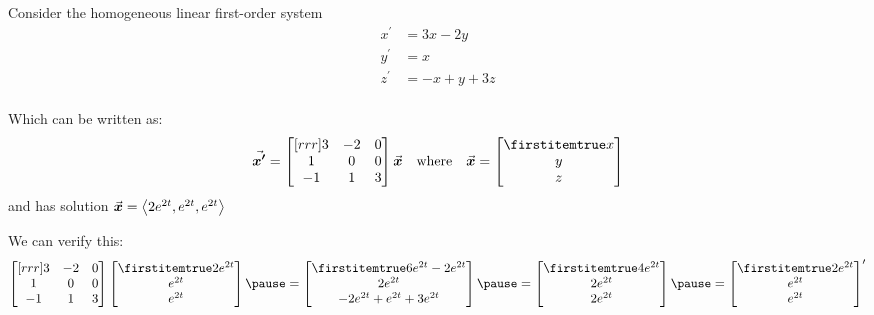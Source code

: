 \documentclass{beamer}
\begin{document}
\begin{frame}
\begin{example}
Consider the homogeneous linear first-order system
\begin{equation*}
\begin{aligned}
x^\prime &= 3x - 2y \\
y^\prime &= x \\
z^\prime &= -x + y + 3z \\
\end{aligned}
\end{equation*}\pause

\vspace{-4mm}
Which can be written as:
\begin{equation*}
\vect{x^\prime}=
\begin{bmatrix}[rrr]
3 & -2 & 0 \\
1 & 0 & 0 \\
-1 & 1 & 3 \\
\end{bmatrix}
\vect{x}
\quad\text{where}\quad
\vect{x}=\bvector{x,y,z}
\end{equation*}\pause
and has solution ${\vec{\boldsymbol{x}}}=\left<2e^{2t}, e^{2t}, e^{2t}\right>$\pause

\vspace{1mm}
We can verify this:
\begin{equation*}
\begin{bmatrix}[rrr]
3 & -2 & 0 \\
1 & 0 & 0 \\
-1 & 1 & 3 \\
\end{bmatrix}
\bvector{2e^{2t},e^{2t},e^{2t}}\pause
=\bvector{6e^{2t}-2e^{2t},2e^{2t},-2e^{2t}+e^{2t}+3e^{2t}}\pause
=\bvector{4e^{2t},2e^{2t},2e^{2t}}\pause
={\bvector{2e^{2t},e^{2t},e^{2t}}}^{\prime}
\end{equation*}

\vspace{-4mm}
\end{example}
\end{frame}
\end{document}
